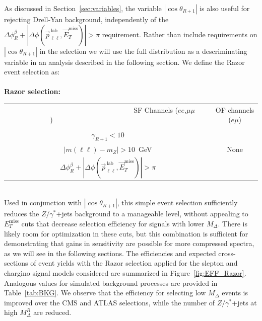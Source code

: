 As discussed in Section~\ref{sec:variables}, the variable $|\cos\theta_{R+1}|$ is also useful for rejecting Drell-Yan background, independently of the $\Delta\phi_{R}^{\beta} + |\Delta\phi (\vec{p}_{\ell\ell}^{\, \text{lab}},\vec{E}_{T}^\text{miss})| > \pi$ requirement. Rather than include requirements on $|\cos\theta_{R+1}|$ in the selection we will use the full distribution as a descriminating variable in an analysis described in the following section. We define the Razor event selection as: \\ \\
{\bf Razor selection:}\\
\begin{tabular}{c c}
~~~~~~~~~~~~~~~~~~~~~~~~~~~~~~~~SF Channels ($ee$,$\mu\mu$)~~~~~~~~~~~~~~~~~~~~~~~~~~~~~~~~ & OF channels ($e\mu$) \\
& \\
$\gamma_{R+1} < 10$ &  \\
$|m(\ell\ell) - m_{Z}| > 10$~GeV  &  None\\
$\Delta\phi_{R}^{\beta} + |\Delta\phi (\vec{p}_{\ell\ell}^{\, \text{lab}},\vec{E}_{T}^\text{miss})| > \pi$ & 
\end{tabular} \\

Used in conjunction with $|\cos\theta_{R+1}|$, this simple event selection sufficiently reduces the $Z/\gamma^{*}$+jets background to a manageable level, without appealing to 
$E_{T}^\text{miss}$ cuts that decrease selection efficiency for signals with lower $M_{\Delta}$. There is likely room for optimization in these cuts, but this combination is sufficient for demonstrating that gains in sensitivity are possible for more compressed spectra, as we will see in the following sections. The efficiencies and expected cross-sections of event yields with the Razor selection applied for the slepton and chargino signal models considered are summarized in Figure~\ref{fig:EFF_Razor}. Analogous values for simulated background processes are provided in Table~\ref{tab:BKG}. We observe that the efficiency for selecting low $M_{\Delta}$ events is improved over the CMS and ATLAS selections, while the number of $Z/\gamma^{*}$+jets at high $M_{\Delta}^{R}$ are reduced.


